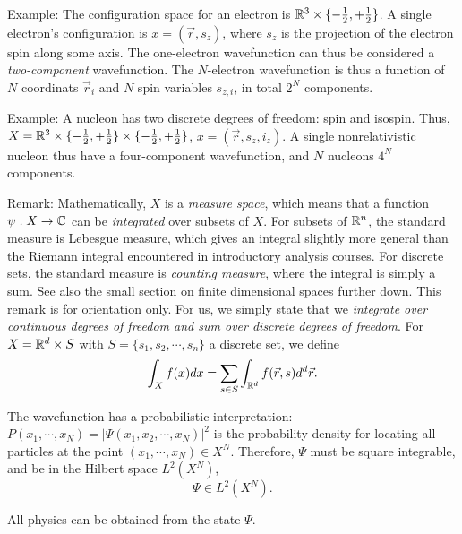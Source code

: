 \documentclass{report}
\theoremstyle{plain}
\theoremstyle{definition}
\begin{document}
Example: The configuration space for an electron is $\mathbb{R}^3 \times
\{-\tfrac{1}{2},+\tfrac{1}{2}\}$. A single electron's configuration is $x = (\vec{r},s_z)$,
where $s_z$ is the projection of the electron spin along some
axis. The one-electron wavefunction can thus be considered a
\emph{two-component} wavefunction. The $N$-electron wavefunction is thus a function of $N$
coordinats $\vec{r}_i$ and $N$ spin variables $s_{z,i}$, in total
$2^N$ components.

Example: A nucleon has two discrete degrees of freedom: spin and
isospin. Thus, $X = \mathbb{R}^3 \times \{-\tfrac{1}{2},+\tfrac{1}{2}\}
\times \{-\tfrac{1}{2},+\tfrac{1}{2}\}$, $x = (\vec{r},s_z,i_z)$. A
single nonrelativistic nucleon thus have a four-component
wavefunction, and $N$ nucleons $4^N$ components.
 

Remark: Mathematically, $X$ is a \emph{measure space}, which means
that a function $ \psi : X \to \mathbb{C}$ can be \emph{integrated} over
subsets of $X$. For
subsets of $\mathbb{R}^n$, the standard measure is Lebesgue measure, which
gives an integral slightly more general than the Riemann integral
encountered in introductory analysis courses. For discrete sets, the
standard measure is \emph{counting measure}, where the integral is
simply a sum. See also the small section on finite dimensional spaces
further down. This remark is for orientation only. For us,
we simply state that we \emph{integrate over continuous degrees of
  freedom and sum over discrete degrees of freedom}. For $X = \mathbb{R}^d
\times S$ with $S = \{ s_1 , s_2, \cdots , s_n\}$ a discrete set, we define
\[ \int_X f(x) dx = \sum_{s\in S} \int_{\mathbb{R}^d} f(\vec{r},s) d^d
\vec{r}. \]

The wavefunction has a probabilistic interpretation:
$P(x_1,\cdots,x_N) = |\Psi(x_1,x_2,\cdots,x_N)|^2$ is the probability density for locating
all particles at the point $(x_1,\cdots,x_N)\in X^N$. Therefore,
$\Psi$ must be square integrable, and be in the Hilbert space $L^2(X^N)$,
\begin{equation}
  \Psi \in L^2(X^N).
\end{equation}


All physics can be obtained from the state $\Psi$.
\end{document}
